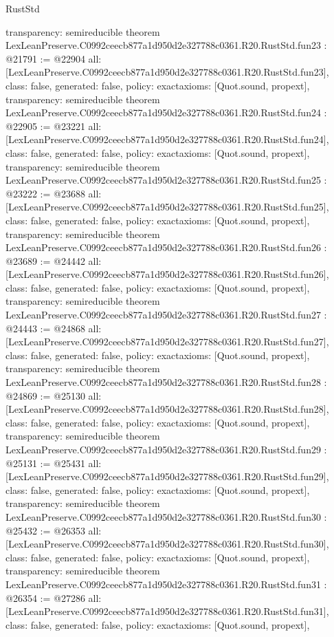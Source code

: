 \begin{lexlean}{RustStd}
\begin{coremodule}
{  transparency: semireducible
}
theorem LexLeanPreserve.C0992ceecb877a1d950d2e327788c0361.R20.RustStd.fun23 : @21791 := @22904 {
  all: [LexLeanPreserve.C0992ceecb877a1d950d2e327788c0361.R20.RustStd.fun23],
  class: false,
  generated: false,
  policy: exact{axioms: [Quot.sound, propext]},
  transparency: semireducible
}
theorem LexLeanPreserve.C0992ceecb877a1d950d2e327788c0361.R20.RustStd.fun24 : @22905 := @23221 {
  all: [LexLeanPreserve.C0992ceecb877a1d950d2e327788c0361.R20.RustStd.fun24],
  class: false,
  generated: false,
  policy: exact{axioms: [Quot.sound, propext]},
  transparency: semireducible
}
theorem LexLeanPreserve.C0992ceecb877a1d950d2e327788c0361.R20.RustStd.fun25 : @23222 := @23688 {
  all: [LexLeanPreserve.C0992ceecb877a1d950d2e327788c0361.R20.RustStd.fun25],
  class: false,
  generated: false,
  policy: exact{axioms: [Quot.sound, propext]},
  transparency: semireducible
}
theorem LexLeanPreserve.C0992ceecb877a1d950d2e327788c0361.R20.RustStd.fun26 : @23689 := @24442 {
  all: [LexLeanPreserve.C0992ceecb877a1d950d2e327788c0361.R20.RustStd.fun26],
  class: false,
  generated: false,
  policy: exact{axioms: [Quot.sound, propext]},
  transparency: semireducible
}
theorem LexLeanPreserve.C0992ceecb877a1d950d2e327788c0361.R20.RustStd.fun27 : @24443 := @24868 {
  all: [LexLeanPreserve.C0992ceecb877a1d950d2e327788c0361.R20.RustStd.fun27],
  class: false,
  generated: false,
  policy: exact{axioms: [Quot.sound, propext]},
  transparency: semireducible
}
theorem LexLeanPreserve.C0992ceecb877a1d950d2e327788c0361.R20.RustStd.fun28 : @24869 := @25130 {
  all: [LexLeanPreserve.C0992ceecb877a1d950d2e327788c0361.R20.RustStd.fun28],
  class: false,
  generated: false,
  policy: exact{axioms: [Quot.sound, propext]},
  transparency: semireducible
}
theorem LexLeanPreserve.C0992ceecb877a1d950d2e327788c0361.R20.RustStd.fun29 : @25131 := @25431 {
  all: [LexLeanPreserve.C0992ceecb877a1d950d2e327788c0361.R20.RustStd.fun29],
  class: false,
  generated: false,
  policy: exact{axioms: [Quot.sound, propext]},
  transparency: semireducible
}
theorem LexLeanPreserve.C0992ceecb877a1d950d2e327788c0361.R20.RustStd.fun30 : @25432 := @26353 {
  all: [LexLeanPreserve.C0992ceecb877a1d950d2e327788c0361.R20.RustStd.fun30],
  class: false,
  generated: false,
  policy: exact{axioms: [Quot.sound, propext]},
  transparency: semireducible
}
theorem LexLeanPreserve.C0992ceecb877a1d950d2e327788c0361.R20.RustStd.fun31 : @26354 := @27286 {
  all: [LexLeanPreserve.C0992ceecb877a1d950d2e327788c0361.R20.RustStd.fun31],
  class: false,
  generated: false,
  policy: exact{axioms: [Quot.sound, propext]},
}
\end{coremodule}
\end{lexlean}
